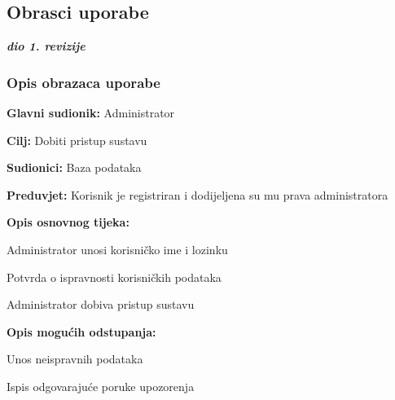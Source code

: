			\eject 
			
			
				
			\subsection{Obrasci uporabe}
				
				\textbf{\textit{dio 1. revizije}}
				
				\subsubsection{Opis obrazaca uporabe}
				
					\noindent {}
				\begin{packed_item}
					
					\item \textbf{Glavni sudionik: }Administrator
					\item  \textbf{Cilj:} Dobiti pristup sustavu
					\item  \textbf{Sudionici:} Baza podataka
					\item  \textbf{Preduvjet:} Korisnik je registriran i dodijeljena su mu prava administratora
					\item  \textbf{Opis osnovnog tijeka:}
					
					\item[] \begin{packed_enum}
						
						\item Administrator unosi korisničko ime i lozinku
						\item Potvrda o ispravnosti korisničkih podataka
						\item Administrator dobiva pristup sustavu
						
					\end{packed_enum}
					
					\item  \textbf{Opis mogućih odstupanja:}
					
					\item[] \begin{packed_item}
						
						\item[2.a] Unos neispravnih podataka
						\item[] \begin{packed_enum}
							
							\item Ispis odgovarajuće poruke upozorenja 
							
							
						\end{packed_enum}
						
						
					\end{packed_item}
				\end{packed_item}
			
